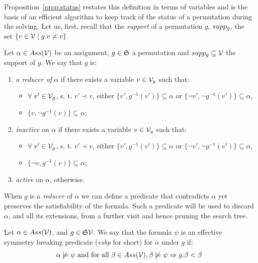 Proposition~\ref{prop:status} restates this definition in terms of variables
and is the basis of an efficient algorithm to keep track of the status of a
permutation during the solving. Let us, first, recall that the \emph{support}
 of a permutation $g$, $supp_g$, the set $\{ v \in \mathcal{V} \mid g.v \neq v\}$.

\begin{proposition}
	\label{prop:status}
	Let $\alpha \in Ass(\mathcal{V})$ be an assignment, $g \in \mathfrak{S}$ a permutation and $ supp_g \subseteq  \mathcal{V}$ the support of $g$. We say that $g$ is:
	\begin{enumerate}
		\item  \emph{a reducer of} $\alpha$  if there exists a variable $v \in \mathcal{V}_g$
		such that:
		\begin{itemize}
			\item $\forall\ v' \in \mathcal{V}_g$, s. t. $v' \prec v$, either $\{v', g^{-1}(v')\}\subseteq\alpha $ or $\{\neg v', \neg g^{-1}(v')\} \subseteq \alpha $,
			\item $\{v, \neg g^{-1}(v)\} \subseteq \alpha$;
		\end{itemize}
		\item  \emph{inactive} on $\alpha$  if there exists a variable $v \in \mathcal{V}_g$
		such that:
		\begin{itemize}
			\item $\forall\ v' \in \mathcal{V}_g$, s. t. $v' \prec v$, either $\{v', g^{-1}(v')\}\subseteq\alpha $ or $\{\neg v', \neg g^{-1}(v')\} \subseteq \alpha $,
			\item $\{\neg v, g^{-1}(v)\} \subseteq \alpha$;
		\end{itemize}
		\item  \emph{active} on $\alpha$, otherwise.
	\end{enumerate}
\end{proposition}

When $g$ is a \textit{reducer} of $\alpha$ we can define a predicate that contradicts $\alpha$ yet preserves the satisfiability of the formula. Such a predicate will be used to discard $\alpha$, and all its extensions, from a further visit and hence pruning the search tree.

\begin{definition}
	\label{def:esbp}
	Let $\alpha \in Ass(\mathcal{V})$, and $g \in \mathfrak{S}{\mathcal{V}}$.
	We say that the formula $\psi$ is an effective symmetry breaking predicate (\textit{esbp} for short) for $\alpha$ under $g$ if:
	$$\alpha \not\models \psi \text{ and for all }\beta \in Ass(\mathcal{V}), \beta \not\models \psi \Rightarrow g.\beta < \beta$$
\end{definition}

